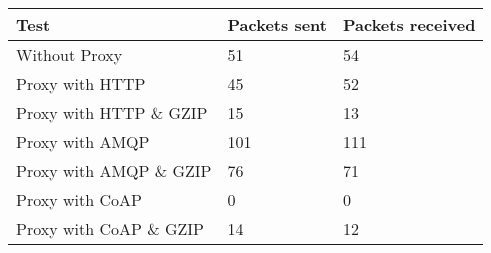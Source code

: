 \begin{tabular}{|l|l|l|}
\hline
\textbf{Test} & \textbf{Packets sent} & \textbf{Packets received} \\ \hline
Without Proxy                    &51         & 54        \\ \hline 
Proxy with HTTP                  &45         & 52        \\ \hline 
Proxy with HTTP \& GZIP          &15         & 13        \\ \hline 
Proxy with AMQP                  &101        & 111       \\ \hline 
Proxy with AMQP \& GZIP          &76         & 71        \\ \hline 
Proxy with CoAP                  &0          & 0         \\ \hline 
Proxy with CoAP \& GZIP          &14         & 12        \\ \hline 
\end{tabular}